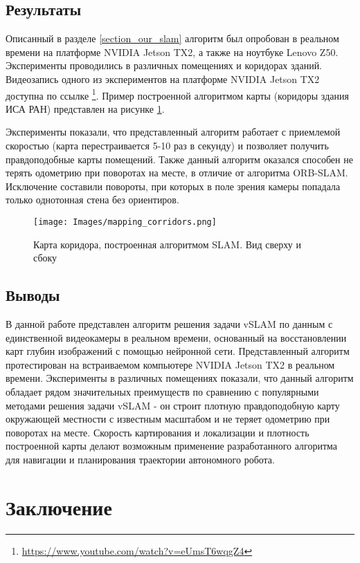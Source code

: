 \documentclass{mipt-thesis-bs}
\begin{document}
\section{Результаты}

Описанный в разделе \ref{section_our_slam} алгоритм был опробован в реальном времени на платформе NVIDIA Jetson TX2, а также на ноутбуке Lenovo Z50. Эксперименты проводились в различных помещениях и коридорах зданий. Видеозапись одного из экспериментов на платформе NVIDIA Jetson TX2 доступна по ссылке \footnote{\href{https://www.youtube.com/watch?v=eUmsT6wqgZ4&feature=youtu.be}{https://www.youtube.com/watch?v=eUmsT6wqgZ4}}. Пример построенной алгоритмом карты (коридоры здания ИСА РАН) представлен на рисунке \ref{figuremap}.

Эксперименты показали, что представленный алгоритм работает с приемлемой скоростью (карта перестраивается 5-10 раз в секунду) и позволяет получить правдоподобные карты помещений. Также данный алгоритм оказался способен не терять одометрию при поворотах на месте, в отличие от алгоритма ORB-SLAM. Исключение составили повороты, при которых в поле зрения камеры попадала только однотонная стена без ориентиров.

\begin{figure}
	\centering
	\texttt{[image: Images/mapping\_corridors.png]}
	\caption{Карта коридора, построенная алгоритмом SLAM. Вид сверху и сбоку}
	\label{figuremap}
\end{figure} 

\section{Выводы}

В данной работе представлен алгоритм решения задачи vSLAM по данным с единственной видеокамеры в реальном времени, основанный на восстановлении карт глубин изображений с помощью нейронной сети. Представленный алгоритм протестирован на встраиваемом компьютере NVIDIA Jetson TX2 в реальном времени. Эксперименты в различных помещениях показали, что данный алгоритм обладает рядом значительных преимуществ по сравнению с популярными методами решения задачи vSLAM - он строит плотную правдоподобную карту окружающей местности с известным масштабом и не теряет одометрию при поворотах на месте. Скорость картирования и локализации и плотность построенной карты делают возможным применение разработанного алгоритма для навигации и планирования траектории автономного робота.

\chapter{Заключение}
\end{document}
